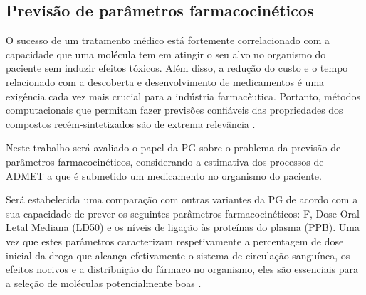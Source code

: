 \subsection{Previsão de parâmetros farmacocinéticos}


O sucesso de um tratamento médico está fortemente correlacionado com a capacidade que uma molécula tem em 
atingir o seu alvo no organismo do paciente sem induzir efeitos tóxicos. 
Além disso, a redução do custo e o tempo relacionado com a descoberta e desenvolvimento de medicamentos é uma 
exigência cada vez mais crucial para a indústria farmacêutica. Portanto, métodos computacionais que permitam 
fazer previsões confiáveis das propriedades dos compostos recém-sintetizados são de extrema relevância \citep{Gunaratna2001}.

Neste trabalho será avaliado o papel da \ac{PG} sobre o problema da previsão de parâmetros farmacocinéticos, 
considerando a estimativa dos processos de \ac{ADMET} a que é 
submetido um medicamento no organismo do paciente.

Será estabelecida uma comparação com outras variantes da \ac{PG} de acordo com a sua capacidade de prever os 
seguintes parâmetros farmacocinéticos: \ac{F}, Dose Oral Letal Mediana (\ac{LD50}) e os níveis de ligação 
às proteínas do plasma (\ac{PPB}). Uma vez que estes parâmetros caracterizam respetivamente a percentagem de dose inicial 
da droga que alcança efetivamente o sistema de circulação sanguínea, os efeitos nocivos e a distribuição do fármaco no organismo, 
eles são essenciais para a seleção de moléculas potencialmente boas \citep{Urso2002}.






